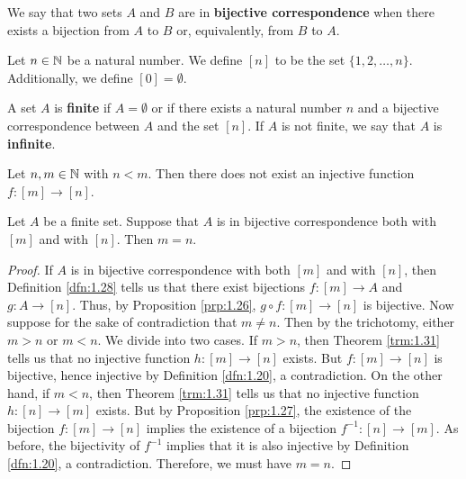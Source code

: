 \documentclass[../main.tex]{subfiles}
\begin{document}
\begin{definition}\label{dfn:1.28}
    We say that two sets $A$ and $B$ are in \textbf{bijective correspondence} when there exists a bijection from $A$ to $B$ or, equivalently, from $B$ to $A$.
\end{definition}

\begin{definition}\label{dfn:1.29}
    Let $n\in\mathbb{N}$ be a natural number. We define $[n]$ to be the set $\{1,2,\dots,n\}$. Additionally, we define $[0]=\emptyset$.
\end{definition}

\begin{definition}\label{dfn:1.30}
    A set $A$ is \textbf{finite} if $A=\emptyset$ or if there exists a natural number $n$ and a bijective correspondence between $A$ and the set $[n]$. If $A$ is not finite, we say that $A$ is \textbf{infinite}.
\end{definition}

\begin{theorem}\label{trm:1.31}
    Let $n,m\in\mathbb{N}$ with $n<m$. Then there does not exist an injective function $f:[m]\to[n]$.
\end{theorem}

\begin{theorem}\label{trm:1.32}
    Let $A$ be a finite set. Suppose that $A$ is in bijective correspondence both with $[m]$ and with $[n]$. Then $m=n$.
    \begin{proof}
        If $A$ is in bijective correspondence with both $[m]$ and with $[n]$, then Definition \ref{dfn:1.28} tells us that there exist bijections $f:[m]\to A$ and $g:A\to[n]$. Thus, by Proposition \ref{prp:1.26}, $g\circ f:[m]\to[n]$ is bijective. Now suppose for the sake of contradiction that $m\neq n$. Then by the trichotomy, either $m>n$ or $m<n$. We divide into two cases. If $m>n$, then Theorem \ref{trm:1.31} tells us that no injective function $h:[m]\to[n]$ exists. But $f:[m]\to[n]$ is bijective, hence injective by Definition \ref{dfn:1.20}, a contradiction. On the other hand, if $m<n$, then Theorem \ref{trm:1.31} tells us that no injective function $h:[n]\to[m]$ exists. But by Proposition \ref{prp:1.27}, the existence of the bijection $f:[m]\to[n]$ implies the existence of a bijection $f^{-1}:[n]\to[m]$. As before, the bijectivity of $f^{-1}$ implies that it is also injective by Definition \ref{dfn:1.20}, a contradiction. Therefore, we must have $m=n$. 
    \end{proof}
\end{theorem}
\end{document}
